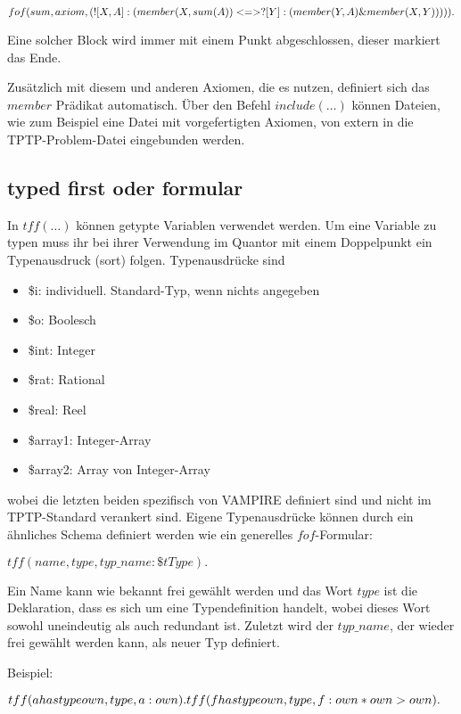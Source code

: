 \documentclass{acm_proc_article-sp-german}
\begin{document}
$fof(sum, axiom, (\\! [X,A] :( member(X,sum(A)) \\<=> ? [Y] : ( member(Y,A)  \&  member(X,Y))))).$

Eine solcher Block wird immer mit einem Punkt abgeschlossen, dieser markiert das Ende.

Zusätzlich mit diesem und anderen Axiomen, die es nutzen, definiert sich das $member$ Prädikat automatisch.
Über den Befehl $include(\dots)$ können Dateien, wie zum Beispiel eine Datei mit vorgefertigten Axiomen, von extern in die TPTP-Problem-Datei eingebunden werden.

\subsection{typed first oder formular}
\label{subsec:tptptff}

In $tff(\dots)$ können getypte Variablen verwendet werden. Um eine Variable zu typen muss ihr bei ihrer Verwendung im Quantor mit einem Doppelpunkt ein Typenausdruck (sort) folgen.
Typenausdrücke sind \begin{itemize}
	\item \$i: individuell. Standard-Typ, wenn nichts angegeben
	\item \$o: Boolesch
	\item \$int: Integer
	\item \$rat: Rational
	\item \$real: Reel
	\item \$array1: Integer-Array
	\item \$array2: Array von Integer-Array
\end{itemize}
wobei die letzten beiden spezifisch von VAMPIRE definiert sind und nicht im TPTP-Standard verankert sind.
Eigene Typenausdrücke können durch ein ähnliches Schema definiert werden wie ein generelles $fof$-Formular:

$tff(name, type, typ\_name: \$tType).$

Ein Name kann wie bekannt frei gewählt werden und das Wort $type$ ist die Deklaration, dass es sich um eine Typendefinition handelt, wobei dieses Wort sowohl uneindeutig als auch redundant ist.
Zuletzt wird der $typ\_name$, der wieder frei gewählt werden kann, als neuer Typ definiert.

Beispiel:

$tff(a has type own,type,a : own).\\
tff(f has type own,type,f : own * own > own).$
\end{document}
